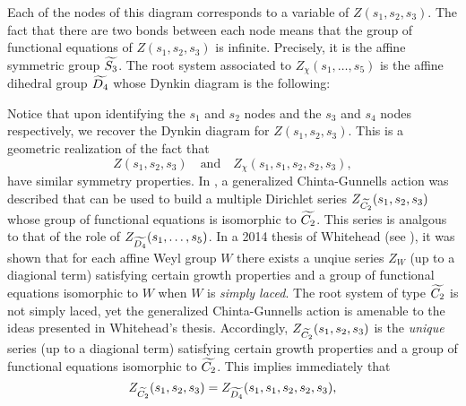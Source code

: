 \documentclass[12pt,reqno,oneside]{amsart}
\begin{document}
Each of the nodes of this diagram corresponds to a variable of $Z(s_{1},s_{2},s_{3})$. The fact that there are two bonds between each node means that the group of functional equations of $Z(s_{1},s_{2},s_{3})$ is infinite. Precisely, it is the affine symmetric group $\widetilde{S_{3}}$. The root system associated to $Z_{\chi}(s_{1},\ldots,s_{5})$ is the affine dihedral group $\widetilde{D_{4}}$ whose Dynkin diagram is the following:
\begin{center}
\end{center}
Notice that upon identifying the $s_{1}$ and $s_{2}$ nodes and the $s_{3}$ and $s_{4}$ nodes respectively, we recover the Dynkin diagram for $Z(s_{1},s_{2},s_{3})$. This is a geometric realization of the fact that
\[
  Z(s_{1},s_{2},s_{3}) \quad \text{and} \quad Z_{\chi}(s_{1},s_{1},s_{2},s_{2},s_{3}),
\]
have similar symmetry properties. In \cite{DIPP}, a generalized Chinta-Gunnells action was described that can be used to build a multiple Dirichlet series $Z_{\widetilde{C_{2}}}(s_{1},s_{2},s_{3})$ whose group of functional equations is isomorphic to $\widetilde{C_{2}}$. This series is analgous to that of the role of $Z_{\widetilde{D_{4}}}(s_{1},\ldots,s_{5})$. In a 2014 thesis of Whitehead (see \cite{W}), it was shown that for each affine Weyl group $W$ there exists a unqiue series $Z_{W}$ (up to a diagional term) satisfying certain growth properties and a group of functional equations isomorphic to $W$ when $W$ is \textit{simply laced}. The root system of type $\widetilde{C_{2}}$ is not simply laced, yet the generalized Chinta-Gunnells action is amenable to the ideas presented in Whitehead's thesis. Accordingly, $Z_{\widetilde{C_{2}}}(s_{1},s_{2},s_{3})$ is the \textit{unique} series (up to a diagional term) satisfying certain growth properties and a group of functional equations isomorphic to $\widetilde{C_{2}}$. This implies immediately that
\[
  Z_{\widetilde{C_{2}}}(s_{1},s_{2},s_{3}) = Z_{\widetilde{D_{4}}}(s_{1},s_{1},s_{2},s_{2},s_{3}),
\]
\end{document}
